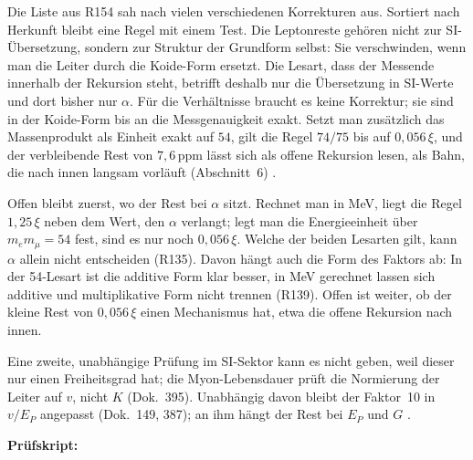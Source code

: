Die Liste aus R154 sah nach vielen verschiedenen Korrekturen aus. Sortiert nach Herkunft bleibt
eine Regel mit einem Test. Die Leptonreste gehören nicht zur SI-Übersetzung, sondern zur Struktur
der Grundform selbst: Sie verschwinden, wenn man die Leiter durch die Koide-Form ersetzt. Die Lesart,
dass der Messende innerhalb der Rekursion steht, betrifft deshalb nur die Übersetzung in SI-Werte und
dort bisher nur $\alpha$. Für die Verhältnisse braucht es keine Korrektur; sie sind in der Koide-Form
bis an die Messgenauigkeit exakt. Setzt man zusätzlich das Massenprodukt als Einheit exakt auf $54$,
gilt die Regel $74/75$ bis auf $0{,}056\,\xi$, und der verbleibende Rest von $7{,}6$\,ppm lässt sich als
offene Rekursion lesen, als Bahn, die nach innen langsam vorläuft (Abschnitt~6) \SM.

Offen bleibt zuerst, wo der Rest bei $\alpha$ sitzt. Rechnet man in MeV, liegt die Regel $1{,}25\,\xi$
neben dem Wert, den $\alpha$ verlangt; legt man die Energieeinheit über $m_em_\mu=54$ fest, sind es nur
noch $0{,}056\,\xi$. Welche der beiden Lesarten gilt, kann $\alpha$ allein nicht entscheiden (R135).
Davon hängt auch die Form des Faktors ab: In der 54-Lesart ist die additive Form klar besser, in
MeV gerechnet lassen sich additive und multiplikative Form nicht trennen (R139). Offen ist weiter,
ob der kleine Rest von $0{,}056\,\xi$ einen Mechanismus hat, etwa die offene Rekursion nach innen.

Eine zweite, unabhängige Prüfung im SI-Sektor kann es nicht geben, weil dieser nur einen
Freiheitsgrad hat; die Myon-Lebensdauer prüft die Normierung der Leiter auf $v$, nicht $K$ (Dok.~395).
Unabhängig davon bleibt der Faktor~10
in $v/E_P$ angepasst (Dok.~149, 387); an ihm hängt der Rest bei $E_P$ und $G$ \SM.

\medskip
\noindent\textbf{Prüfskript:} 
